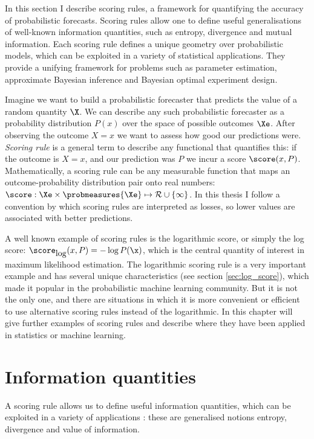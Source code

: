 In this section I describe scoring rules, a framework for quantifying the accuracy of probabilistic forecasts. Scoring rules allow one to define useful generalisations of well-known information quantities, such as entropy, divergence and mutual information. Each scoring rule defines a unique geometry over probabilistic models, which can be exploited in a variety of statistical applications. They provide a unifying framework for problems such as parameter estimation, approximate Bayesian inference and Bayesian optimal experiment design.

Imagine we want to build a probabilistic forecaster that predicts the value of a random quantity $\X$. We can describe any such probabilistic forecaster as a probability distribution $P(x)$ over the space of possible outcomes $\Xe$. After observing the outcome $X=x$ we want to assess how good our predictions were. \emph{Scoring rule} is a general term to describe any functional that quantifies this: if the outcome is $X=x$, and our prediction was $P$ we incur a score $\score (x,P)$.  Mathematically, a scoring rule can be any measurable function that maps an outcome-probability distribution pair onto real numbers: $\score:\Xe\times\probmeasures{\Xe}\mapsto\mathcal{R}\cup\{\infty\}$. In this thesis I follow a convention by which scoring rules are interpreted as losses, so lower values are associated with better predictions.

A well known example of scoring rules is the logarithmic score, or simply the log score: $\score_{\mbox{log}}(x,P) = -\log P(\x)$, which is the central quantity of interest in maximum likelihood estimation. The logarithmic scoring rule is a very important example and has several unique characteristics (see section \ref{sec:log_score}), which made it popular in the probabilistic machine learning community. But it is not the only one, and there are situations in which it is more convenient or efficient to use alternative scoring rules instead of the logarithmic. In this chapter will give further examples of scoring rules and describe where they have been applied in statistics or machine learning.

\section{Information quantities}

A scoring rule allows us to define useful information quantities, which can be exploited in a variety of applications \cite[see also][]{Blaetal2332}: these are generalised notions entropy, divergence and value of information.

